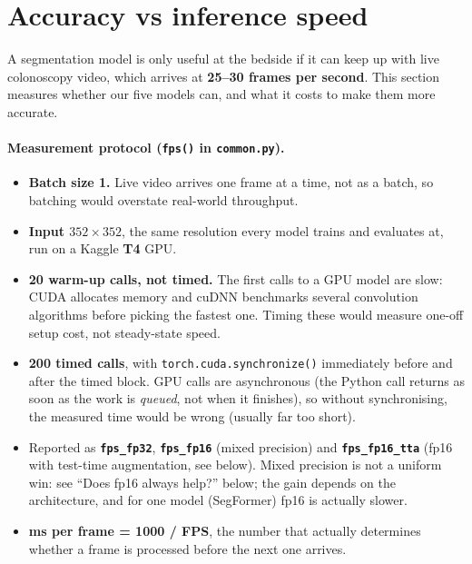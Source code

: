 \section{Accuracy vs inference speed}
\label{sec:speed}
A segmentation model is only useful at the bedside if it can keep up with live colonoscopy video, which
arrives at \textbf{25--30 frames per second}. This section measures whether our five models can, and what it
costs to make them more accurate.

\paragraph{Measurement protocol (\texttt{fps()} in \texttt{common.py}).}
\begin{itemize}
  \item \textbf{Batch size 1.} Live video arrives one frame at a time, not as a batch, so batching would overstate
        real-world throughput.
  \item \textbf{Input $352\times352$}, the same resolution every model trains and evaluates at, run on a Kaggle \textbf{T4} GPU.
  \item \textbf{20 warm-up calls, not timed.} The first calls to a GPU model are slow: CUDA allocates memory and cuDNN
        benchmarks several convolution algorithms before picking the fastest one. Timing these would measure
        one-off setup cost, not steady-state speed.
  \item \textbf{200 timed calls}, with \texttt{torch.cuda.synchronize()} immediately before and after the timed block. GPU
        calls are asynchronous (the Python call returns as soon as the work is \emph{queued}, not when it finishes),
        so without synchronising, the measured time would be wrong (usually far too short).
  \item Reported as \textbf{\texttt{fps\_fp32}}, \textbf{\texttt{fps\_fp16}} (mixed precision) and \textbf{\texttt{fps\_fp16\_tta}} (fp16 with test-time
        augmentation, see below). Mixed precision is not a uniform win: see ``Does fp16 always help?'' below; the
        gain depends on the architecture, and for one model (SegFormer) fp16 is actually slower.
  \item \textbf{ms per frame = 1000 / FPS}, the number that actually determines whether a frame is processed before
        the next one arrives.
\end{itemize}

